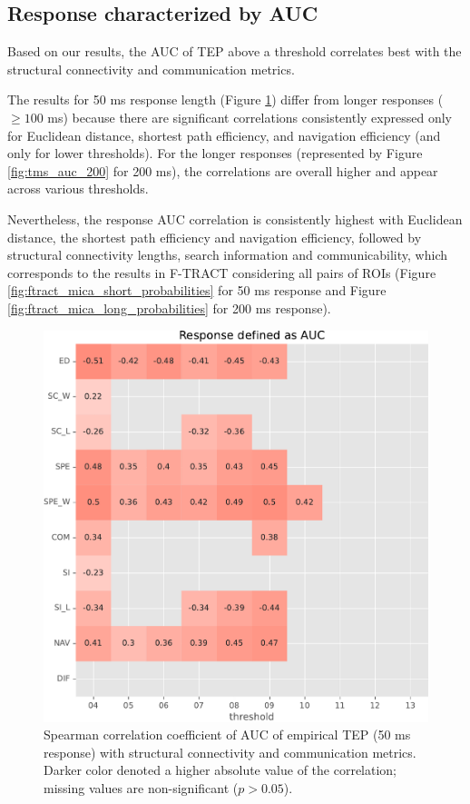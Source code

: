 \subsection{Response characterized by AUC}

Based on our results, the AUC of TEP above a threshold correlates best with the structural connectivity and communication metrics.

The results for 50 ms response length (Figure \ref{fig:tms_auc_50}) differ from longer responses ($\geq100$ ms) because there are significant correlations consistently expressed only for Euclidean distance, shortest path efficiency, and navigation efficiency (and only for lower thresholds). For the longer responses (represented by Figure \ref{fig:tms_auc_200} for 200 ms), the correlations are overall higher and appear across various thresholds. 

Nevertheless, the response AUC correlation is consistently highest with Euclidean distance, the shortest path efficiency and navigation efficiency, followed by structural connectivity lengths, search information and communicability, which corresponds to the results in F-TRACT considering all pairs of ROIs (Figure \ref{fig:ftract_mica_short_probabilities} for 50 ms response and Figure \ref{fig:ftract_mica_long_probabilities} for 200 ms response).

\begin{figure}
    \centering
    \includegraphics[width=\textwidth]{images/nootebook_generated/pytepfit_results/empirical/50/not_over_threshold_nan/Response defined as AUC.pdf}
    \caption[TEPs AUC (50 ms) correlation with SC and communication metrics]{Spearman correlation coefficient of AUC of empirical TEP (50 ms response) with structural connectivity and communication metrics. Darker color denoted a higher absolute value of the correlation; missing values are non-significant ($p>0.05$).}
    \label{fig:tms_auc_50}
\end{figure}

